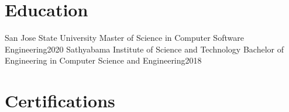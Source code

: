 \documentclass{resume}
\begin{document}
\section{Education}
\resumeSubHeadingListStart
\resumeSubheading
  {San Jose State University}{}
  {Master of Science in Computer Software Engineering}{2020}
\resumeSubheading
  {Sathyabama Institute of Science and Technology}{}
  {Bachelor of Engineering in Computer Science and Engineering}{2018}
\resumeSubHeadingListEnd

\section{Certifications}
\resumeSubHeadingListStart
{}
\resumeSubHeadingListEnd
\end{document}
